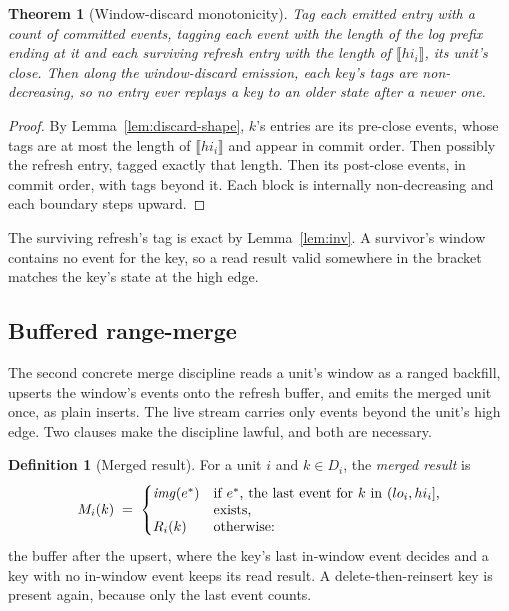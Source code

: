 \documentclass[sigconf,nonacm,10pt]{acmart}
\theoremstyle{plain}
\newtheorem{theorem}{Theorem}
\theoremstyle{definition}
\newtheorem{definition}{Definition}[section]
\newcommand{\den}[1]{\llbracket #1 \rrbracket}   %
\newcommand{\window}[2]{(#1,#2]}                 %
\newcommand{\imgof}{\mathit{img}}                %
\begin{document}
\begin{theorem}[Window-discard monotonicity]\label{thm:discard-mono}
Tag each emitted entry with a count of committed events, tagging each event
with the length of the log prefix ending at it and each surviving
refresh entry with the length of $\den{hi_i}$, its unit's close.
Then along the window-discard emission,
each key's tags are non-decreasing, so no entry ever replays a key to
an older state after a newer one.
\end{theorem}

\begin{proof}
By Lemma~\ref{lem:discard-shape}, $k$'s entries are its pre-close
events, whose tags are at most the length of $\den{hi_i}$ and
appear in
commit order. Then possibly the refresh entry, tagged exactly that
length. Then
its post-close events, in commit order, with tags beyond it.
Each block is internally non-decreasing and each boundary
steps upward.
\end{proof}

The surviving refresh's tag is exact by
Lemma~\ref{lem:inv}. A survivor's window contains no event for the key, so a read result valid somewhere in the bracket matches the key's state at the high edge.

\subsection{Buffered range-merge}\label{sec:merge-range}

The second concrete merge discipline reads a unit's window as a ranged
backfill, upserts the window's events onto the refresh buffer, and
emits the merged unit once, as plain inserts. The live stream
carries only events beyond the unit's high edge. Two clauses make the discipline lawful, and both are necessary.

\begin{definition}[Merged result]\label{def:merged}
For a unit $i$ and $k \in D_i$, the \emph{merged result} is
\[
M_i(k) \;=\;
\begin{cases}
\imgof(e^{\ast}) & \parbox[t]{0.47\columnwidth}{if $e^{\ast}$, the
  last event for $k$ in $\window{lo_i}{hi_i}$, exists,}\\[2pt]
R_i(k) & \text{otherwise:}
\end{cases}
\]
the buffer after the upsert, where the key's last in-window event decides and a key with no in-window event keeps its read result. A
delete-then-reinsert key is present again, because only the last
event counts.
\end{definition}
\end{document}
